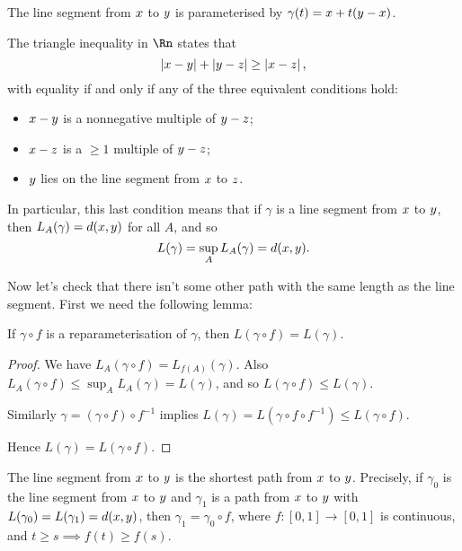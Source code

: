 \begin{example}
	The line segment from $x$ to $y$ is parameterised by $\gamma(t) = x + t(y - x)$.

	The triangle inequality in $\Rn$ states that
	\begin{equation*}
		\left\vert x - y \right\vert + \left\vert y - z \right\vert \geq \left\vert x - z \right\vert,
	\end{equation*}
	with equality if and only if any of the three equivalent conditions hold:
	\begin{itemize}
		\shortskip
		\item $x - y$ is a nonnegative multiple of $y - z$;
		\item $x - z$ is a $\geq 1$ multiple of $y - z$;
		\item $y$ lies on the line segment from $x$ to $z$.
	\end{itemize}
	In particular, this last condition means that if $\gamma$ is a line segment from $x$ to $y$, then $L_A(\gamma) = d(x,y)$ for all $A$, and so %
	\begin{equation*}
		L(\gamma) = \sup_A L_A(\gamma) = d(x,y).
	\end{equation*}
\end{example}

Now let's check that there isn't some other path with the same length as the line segment. First we need the following lemma:

\begin{lemma}
	If $\gamma\circ f$ is a reparameterisation of $\gamma$, then $L(\gamma \circ f) = L(\gamma)$. %
\end{lemma}

\begin{proof}
	We have $L_A(\gamma \circ f) = L_{f(A)}(\gamma)$. Also $L_A(\gamma \circ f) \leq \sup_A L_A(\gamma) = L(\gamma)$, and so $L(\gamma \circ f) \leq L(\gamma)$. %
	
	Similarly $\gamma= (\gamma \circ f) \circ f^{-1}$ implies $L(\gamma) = L(\gamma \circ f \circ f^{-1}) \leq L(\gamma \circ f)$. %
	
	Hence $L(\gamma) = L(\gamma \circ f)$.
\end{proof}

\begin{proposition}
	The line segment from $x$ to $y$ is the shortest path from $x$ to $y$. Precisely, if $\gamma_0$ is the line segment from $x$ to $y$ and $\gamma_1$ is a path from $x$ to $y$ with $L(\gamma_0) = L(\gamma_1) = d(x,y)$, then $\gamma_1 = \gamma_0 \circ f$, where $f:[0,1] \to [0,1]$ is continuous, and $t\geq s \implies f(t)\geq f(s)$. %
	
\end{proposition}

